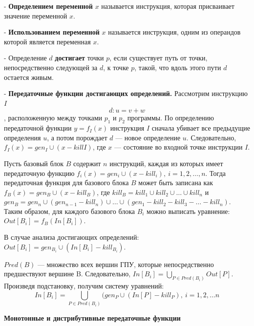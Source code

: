 - \textbf{Определением переменной} $x$ называется инструкция, которая присваивает значение переменной $x$.

- \textbf{Использованием переменной} $x$ называется инструкция, одним из операндов которой является переменная $x$.

- Определение $d$ \textbf{достигает} точки $p$, если существует путь от точки, непосредственно следующей за $d$, к точке $p$, такой, что вдоль этого пути $d$ остается живым.

- \textbf{Передаточные функции достигающих определений.}
Рассмотрим инструкцию $I$
$$d: u = v + w$$,
расположенную между точками $p_1$ и $p_2$ программы.
По определению передаточной функции $y = f_I(x)$ инструкция $I$ сначала убивает все предыдущие определения $u$, а потом порождает $d$ --- новое определение $u$. 
Следовательно, $f_I(x) = gen_I \cup (x - kill I)$, где $x$ --- состояние во входной точке инструкции $I$.

Пусть базовый блок $B$ содержит $n$ инструкций, каждая из которых имеет передаточную функцию $f_i(x) = gen_i \cup (x - kill_i),~i = 1, 2, \dots, n$. 
Тогда передаточная функция для базового блока $B$ может быть записана как $f_B(x) = gen_B \cup (x - kill_B)$, где $kill_B = kill_1 \cup kill_2 \cup \dots \cup kill_n$ и $gen_B = gen_n \cup (gen_{n-1} - kill_n) \cup \dots \cup (gen_1 - kill_2 - kill_3 - \dots - kill_n)$.
Таким образом, для каждого базового блока $B_i$ можно выписать уравнение: $Out[B_i] = f_B(In[B_i])$.

В случае анализа достигающих определений: $Out[B_i] = gen_{B_i} \cup (In[B_i] - kill_{B_i})$.

$Pred(B)$ --- множество всех вершин ГПУ, которые непосредственно предшествуют вершине B. 
Следовательно, $In[B_i] = \bigcup_{P \in Pred(B_i)} Out[P]$. 
Произведя подстановку, получим систему уравнений:
$$In[B_i] = \displaystyle\bigcup_{P \in Pred(B_i)} (gen_P \cup (In[P] - kill_P),~i = 1, 2, \dots n$$


\textbf{Монотонные и дистрибутивные передаточные функции}

